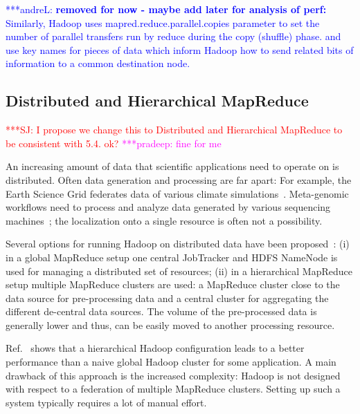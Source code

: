 \documentclass{acm_proc_article-sp}
\newcommand{\jhanote}[1]{ {\textcolor{red} { ***SJ: #1 }}}
\newcommand{\alnote}[1]{ {\textcolor{blue} { ***andreL: #1 }}}
\newcommand{\pnote}[1]{ {\textcolor{magenta} { ***pradeep: #1 }}}
\newcommand{\alnote}[1]{}
\newcommand{\pnote}[1]{}
\newcommand{\jhanote}[1]{}
\newcommand{\upp}{\vspace*{-0.5em}}
\begin{document}
\alnote{\textbf{removed for now - maybe add later for analysis of perf:} Similarly, Hadoop uses mapred.reduce.parallel.copies parameter to set
the number of parallel transfers run by reduce during the
copy (shuffle) phase.  and use key names for pieces of data which
inform Hadoop how to send related bits of information to a common
destination node.}


\upp
\subsection{Distributed and Hierarchical MapReduce}
\label{sec:pmr-distributed} \jhanote{I propose we change this to Distributed and 
Hierarchical MapReduce to be consistent with 5.4. ok?} \pnote { fine for me }

An increasing amount of data that scientific applications need to
operate on is distributed. Often data generation
and processing are far apart: For example, the Earth Science Grid
federates data of various climate simulations~\cite{ESG}. Meta-genomic
workflows need to process and analyze data generated by various
sequencing machines~\cite{Jha:2011fk}; the localization onto a single
resource is often not a possibility.

Several options for running Hadoop on distributed data have been
proposed~\cite{weissman-mr-11}: (i) in a global MapReduce setup one
central JobTracker and HDFS NameNode is used for managing a
distributed set of resources; (ii) in a hierarchical MapReduce setup
multiple MapReduce clusters are used: a MapReduce cluster close to the
data source for pre-processing data and a central cluster for
aggregating the different de-central data sources. The volume of the
pre-processed data is generally lower and thus, can be easily moved to
another processing resource. 

Ref.~\cite{weissman-mr-11} shows that a hierarchical Hadoop
configuration leads to a better performance than a naive global Hadoop
cluster for some application. A main drawback of this approach is the
increased complexity: Hadoop is not designed with respect to a
federation of multiple MapReduce clusters. Setting up such a
system typically requires a lot of manual effort.  


  

\end{document}
